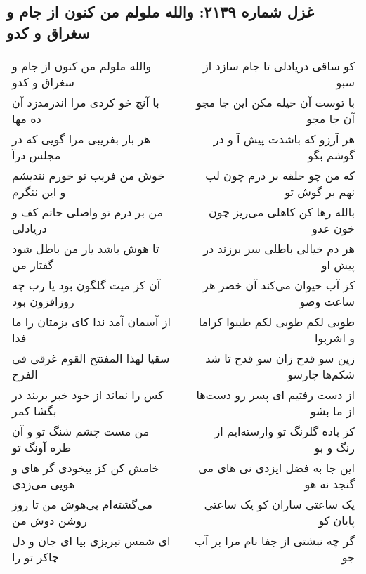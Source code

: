 \begin{center}
\section*{غزل شماره ۲۱۳۹: والله ملولم من کنون از جام و سغراق و کدو}
\label{sec:2139}
\begin{longtable}{l p{0.5cm} r}
والله ملولم من کنون از جام و سغراق و کدو
&&
کو ساقی دریادلی تا جام سازد از سبو
\\
با آنچ خو کردی مرا اندرمدزد آن ده مها
&&
با توست آن حیله مکن این جا مجو آن جا مجو
\\
هر بار بفریبی مرا گویی که در مجلس درآ
&&
هر آرزو که باشدت پیش آ و در گوشم بگو
\\
خوش من فریب تو خورم نندیشم و این ننگرم
&&
که من چو حلقه بر درم چون لب نهم بر گوش تو
\\
من بر درم تو واصلی حاتم کف و دریادلی
&&
بالله رها کن کاهلی می‌ریز چون خون عدو
\\
تا هوش باشد یار من باطل شود گفتار من
&&
هر دم خیالی باطلی سر برزند در پیش او
\\
آن کز میت گلگون بود یا رب چه روزافزون بود
&&
کز آب حیوان می‌کند آن خضر هر ساعت وضو
\\
از آسمان آمد ندا کای بزمتان را ما فدا
&&
طوبی لکم طوبی لکم طیبوا کراما و اشربوا
\\
سقیا لهذا المفتتح القوم غرقی فی الفرح
&&
زین سو قدح زان سو قدح تا شد شکم‌ها چارسو
\\
کس را نماند از خود خبر بربند در بگشا کمر
&&
از دست رفتیم ای پسر رو دست‌ها از ما بشو
\\
من مست چشم شنگ تو و آن طره آونگ تو
&&
کز باده گلرنگ تو وارسته‌ایم از رنگ و بو
\\
خامش کن کز بیخودی گر های و هویی می‌زدی
&&
این جا به فضل ایزدی نی های می گنجد نه هو
\\
می‌گشته‌ام بی‌هوش من تا روز روشن دوش من
&&
یک ساعتی ساران کو یک ساعتی پایان کو
\\
ای شمس تبریزی بیا ای جان و دل چاکر تو را
&&
گر چه نبشتی از جفا نام مرا بر آب جو
\\
\end{longtable}
\end{center}
